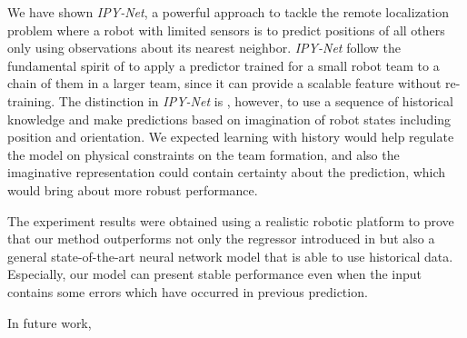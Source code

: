\documentclass[letterpaper, 10 pt, conference]{ieeeconf}  %
\begin{document}
	We have shown \emph{IPY-Net}, a powerful approach to tackle the remote localization problem 
	where a robot with limited sensors is to predict positions of all others only using 
	observations about its nearest neighbor. 
	\emph{IPY-Net} follow the fundamental spirit of \cite{Choi17} to apply a predictor 
	trained for a small robot team to a chain of them in a larger team, since it 
	can provide a scalable feature without re-training.   
	The distinction in \emph{IPY-Net} is , however, to use a sequence of historical knowledge and 
	make predictions based on imagination of robot states including position and orientation.
	We expected learning with history would help regulate the model on physical constraints on 
	the team formation, and also the imaginative representation could contain 
	certainty about the prediction, which would bring about more robust performance. 
	
	The experiment results were obtained using a realistic robotic platform to prove 
	that our method outperforms not only the regressor
	introduced in \cite{Choi17} but also a general state-of-the-art neural network 
	model that is able to use historical data. Especially, our model can present 
	stable performance even when the input contains some errors which have occurred in 
	previous prediction. 
	  
	
	In future work, 
	
	
{\small
	
	
}
\end{document}
